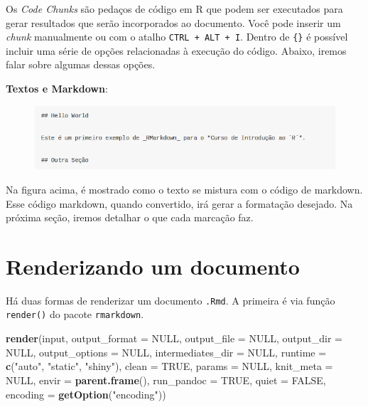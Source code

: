 \documentclass[]{book}
\newenvironment{Shaded}{\begin{snugshade}}{\end{snugshade}}
\newcommand{\KeywordTok}[1]{\textcolor[rgb]{0.13,0.29,0.53}{\textbf{#1}}}
\newcommand{\DataTypeTok}[1]{\textcolor[rgb]{0.13,0.29,0.53}{#1}}
\newcommand{\StringTok}[1]{\textcolor[rgb]{0.31,0.60,0.02}{#1}}
\newcommand{\OtherTok}[1]{\textcolor[rgb]{0.56,0.35,0.01}{#1}}
\newcommand{\NormalTok}[1]{#1}
\begin{document}
Os \emph{Code Chunks} são pedaços de código em R que podem ser
executados para gerar resultados que serão incorporados ao documento.
Você pode inserir um \emph{chunk} manualmente ou com o atalho
\texttt{CTRL\ +\ ALT\ +\ I}. Dentro de \texttt{\{\}} é possível incluir
uma série de opções relacionadas à execução do código. Abaixo, iremos
falar sobre algumas dessas opções.

\textbf{Textos e Markdown}:

\begin{figure}
\centering
\includegraphics{images/texto_rmarkdown.png}
\caption{}
\end{figure}

Na figura acima, é mostrado como o texto se mistura com o código de
markdown. Esse código markdown, quando convertido, irá gerar a
formatação desejado. Na próxima seção, iremos detalhar o que cada
marcação faz.

\section{Renderizando um documento}\label{renderizando-um-documento}

Há duas formas de renderizar um documento \texttt{.Rmd}. A primeira é
via função \texttt{render()} do pacote \texttt{rmarkdown}.

\begin{Shaded}
\begin{Highlighting}[]
\KeywordTok{render}\NormalTok{(input, }\DataTypeTok{output_format =} \OtherTok{NULL}\NormalTok{, }\DataTypeTok{output_file =} \OtherTok{NULL}\NormalTok{, }\DataTypeTok{output_dir =} \OtherTok{NULL}\NormalTok{,}
       \DataTypeTok{output_options =} \OtherTok{NULL}\NormalTok{, }\DataTypeTok{intermediates_dir =} \OtherTok{NULL}\NormalTok{,}
       \DataTypeTok{runtime =} \KeywordTok{c}\NormalTok{(}\StringTok{"auto"}\NormalTok{, }\StringTok{"static"}\NormalTok{, }\StringTok{"shiny"}\NormalTok{),}
       \DataTypeTok{clean =} \OtherTok{TRUE}\NormalTok{, }\DataTypeTok{params =} \OtherTok{NULL}\NormalTok{, }\DataTypeTok{knit_meta =} \OtherTok{NULL}\NormalTok{, }\DataTypeTok{envir =} \KeywordTok{parent.frame}\NormalTok{(),}
       \DataTypeTok{run_pandoc =} \OtherTok{TRUE}\NormalTok{, }\DataTypeTok{quiet =} \OtherTok{FALSE}\NormalTok{, }\DataTypeTok{encoding =} \KeywordTok{getOption}\NormalTok{(}\StringTok{"encoding"}\NormalTok{))}
\end{Highlighting}
\end{Shaded}
\end{document}

